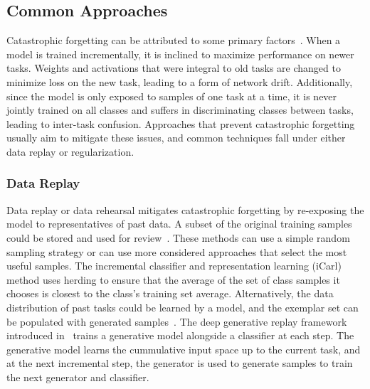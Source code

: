 
\subsection{Common Approaches}
\label{sec:cil_techniques}

Catastrophic forgetting can be attributed to some primary factors~\cite{masana2023cilsurvey}. When a model is trained incrementally, it is inclined to maximize performance on newer tasks. Weights and activations that were integral to old tasks are changed to minimize loss on the new task, leading to a form of network drift. Additionally, since the model is only exposed to samples of one task at a time, it is never jointly trained on all classes and suffers in discriminating classes between tasks, leading to inter-task confusion. Approaches that prevent catastrophic forgetting usually aim to mitigate these issues, and common techniques fall under either data replay or regularization.

\subsubsection{Data Replay}

Data replay or data rehearsal mitigates catastrophic forgetting by re-exposing the model to representatives of past data. A subset of the original training samples could be stored and used for review~\cite{rebuffi2017icarl,wu2019large,hou2019learning}. These methods can use a simple random sampling strategy or can use more considered approaches that select the most useful samples. The incremental classifier and representation learning (iCarl)~\cite{rebuffi2017icarl} method uses herding to ensure that the average of the set of class samples it chooses is closest to the class's training set average. Alternatively, the data distribution of past tasks could be learned by a model, and the exemplar set can be populated with generated samples~\cite{hayes2020remind,lesort2019generative,shin2017continual}. The deep generative replay framework introduced in~\cite{shin2017continual} trains a generative model alongside a classifier at each step. The generative model learns the cummulative input space up to the current task, and at the next incremental step, the generator is used to generate samples to train the next generator and classifier.

